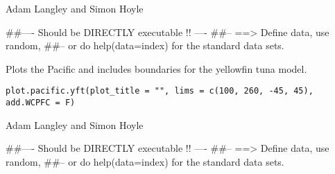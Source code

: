 \documentclass[a4paper]{book}
\begin{document}
%
\begin{Arguments}
\begin{ldescription}
\item[\code{plot\_title}] 


\item[\code{lims}] 


\end{ldescription}
\end{Arguments}
%
\begin{Author}\relax

Adam Langley and Simon Hoyle
\end{Author}
%
\begin{Examples}
\begin{ExampleCode}
##---- Should be DIRECTLY executable !! ----
##-- ==>  Define data, use random,
##--	or do  help(data=index)  for the standard data sets.

\end{ExampleCode}
\end{Examples}
%
\begin{Description}\relax

Plots the Pacific and includes boundaries for the yellowfin tuna model. 
\end{Description}
%
\begin{Usage}
\begin{verbatim}
plot.pacific.yft(plot_title = "", lims = c(100, 260, -45, 45), add.WCPFC = F)
\end{verbatim}
\end{Usage}
%
\begin{Arguments}
\begin{ldescription}
\item[\code{plot\_title}] 


\item[\code{lims}] 


\item[\code{add.WCPFC}] 


\end{ldescription}
\end{Arguments}
%
\begin{Author}\relax

Adam Langley and Simon Hoyle
\end{Author}
%
\begin{Examples}
\begin{ExampleCode}
##---- Should be DIRECTLY executable !! ----
##-- ==>  Define data, use random,
##--	or do  help(data=index)  for the standard data sets.

\end{ExampleCode}
\end{Examples}
\end{document}
